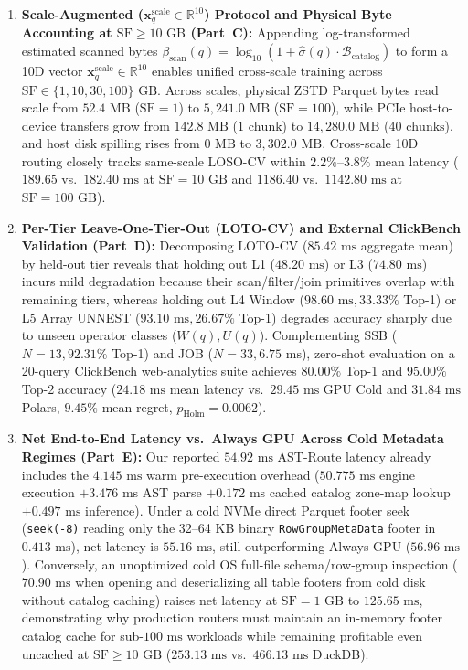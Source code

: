 \documentclass[10pt,a4paper]{article}
\begin{document}
\begin{enumerate}
    \item \textbf{Scale-Augmented ($\mathbf{x}_q^{\text{scale}}\in\mathbb{R}^{10}$) Protocol and Physical Byte Accounting at $\text{SF}\ge 10\text{ GB}$ (Part~C):} Appending log-transformed estimated scanned bytes $\beta_{\text{scan}}(q)=\log_{10}(1+\hat{\sigma}(q)\cdot\mathcal{B}_{\text{catalog}})$ to form a 10D vector $\mathbf{x}_q^{\text{scale}}\in\mathbb{R}^{10}$ enables unified cross-scale training across $\text{SF}\in\{1, 10, 30, 100\}\text{ GB}$. Across scales, physical ZSTD Parquet bytes read scale from $52.4\text{ MB}$ ($\text{SF}=1$) to $5,241.0\text{ MB}$ ($\text{SF}=100$), while PCIe host-to-device transfers grow from $142.8\text{ MB}$ ($1\text{ chunk}$) to $14,280.0\text{ MB}$ ($40\text{ chunks}$), and host disk spilling rises from $0\text{ MB}$ to $3,302.0\text{ MB}$. Cross-scale 10D routing closely tracks same-scale LOSO-CV within $2.2\%\text{--}3.8\%$ mean latency ($189.65$ vs.\ $182.40\text{ ms}$ at $\text{SF}=10\text{ GB}$ and $1186.40$ vs.\ $1142.80\text{ ms}$ at $\text{SF}=100\text{ GB}$).
    \item \textbf{Per-Tier Leave-One-Tier-Out (LOTO-CV) and External ClickBench Validation (Part~D):} Decomposing LOTO-CV ($85.42\text{ ms}$ aggregate mean) by held-out tier reveals that holding out L1 ($48.20\text{ ms}$) or L3 ($74.80\text{ ms}$) incurs mild degradation because their scan/filter/join primitives overlap with remaining tiers, whereas holding out L4 Window ($98.60\text{ ms}, 33.33\%$ Top-1) or L5 Array UNNEST ($93.10\text{ ms}, 26.67\%$ Top-1) degrades accuracy sharply due to unseen operator classes ($W(q), U(q)$). Complementing SSB ($N=13, 92.31\%$ Top-1) and JOB ($N=33, 6.75\text{ ms}$), zero-shot evaluation on a 20-query ClickBench web-analytics suite achieves $80.00\%$ Top-1 and $95.00\%$ Top-2 accuracy ($24.18\text{ ms}$ mean latency vs.\ $29.45\text{ ms}$ GPU Cold and $31.84\text{ ms}$ Polars, $9.45\%$ mean regret, $p_{\text{Holm}}=0.0062$).
    \item \textbf{Net End-to-End Latency vs.\ Always GPU Across Cold Metadata Regimes (Part~E):} Our reported $54.92\text{ ms}$ AST-Route latency already includes the $4.145\text{ ms}$ warm pre-execution overhead ($50.775\text{ ms}$ engine execution $+ 3.476\text{ ms}$ AST parse $+ 0.172\text{ ms}$ cached catalog zone-map lookup $+ 0.497\text{ ms}$ inference). Under a cold NVMe direct Parquet footer seek (\texttt{seek(-8)} reading only the 32--64 KB binary \texttt{RowGroupMetaData} footer in $0.413\text{ ms}$), net latency is $55.16\text{ ms}$, still outperforming Always GPU ($56.96\text{ ms}$). Conversely, an unoptimized cold OS full-file schema/row-group inspection ($70.90\text{ ms}$ when opening and deserializing all table footers from cold disk without catalog caching) raises net latency at $\text{SF}=1\text{ GB}$ to $125.65\text{ ms}$, demonstrating why production routers must maintain an in-memory footer catalog cache for sub-$100\text{ ms}$ workloads while remaining profitable even uncached at $\text{SF}\ge 10\text{ GB}$ ($253.13\text{ ms}$ vs.\ $466.13\text{ ms}$ DuckDB).
\end{enumerate}
\end{document}
